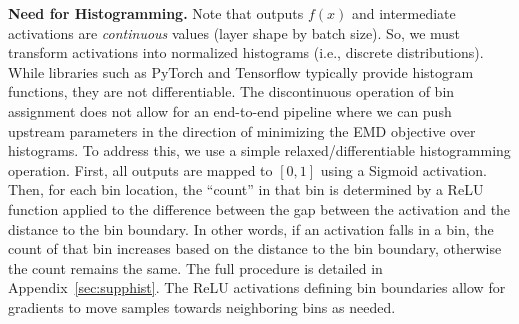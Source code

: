 

{\bf Need for Histogramming.} 
Note that outputs $f(x)$ and intermediate activations are \textit{continuous} values (layer shape by batch size).
So, we must transform activations into normalized histograms (i.e., discrete distributions).
While libraries such as PyTorch and Tensorflow typically provide histogram functions, they are not differentiable. The discontinuous operation of bin assignment does not allow for an end-to-end pipeline where we can push upstream parameters in the direction of minimizing the EMD objective over histograms.
To address this, we 
use a simple relaxed/differentiable histogramming operation. 
First, all outputs are mapped to $[0,1]$ using a Sigmoid activation. Then, for each bin location, the ``count'' in that bin is determined by a ReLU function applied to the difference between the gap between the activation and the distance to the bin boundary. In other words, if an activation falls in a bin, the count of that bin increases based on the distance to the bin boundary, otherwise the count remains the same.
The full procedure is detailed in Appendix~\ref{sec:supphist}.
The ReLU activations defining bin boundaries allow for gradients to move samples towards neighboring bins as needed.

